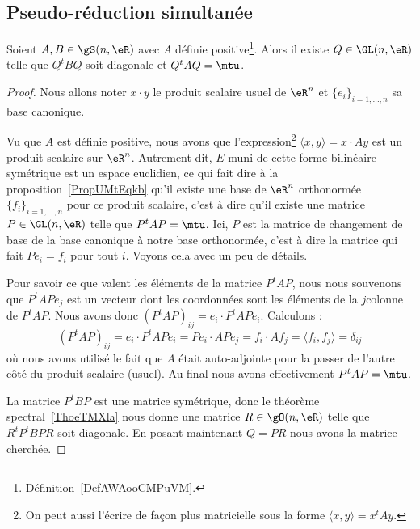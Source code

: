 \subsection{Pseudo-réduction simultanée}

\begin{corollary}  \label{CorNHKnLVA}
    Soient \( A,B\in \gS(n,\eR)\) avec \( A\) définie positive\footnote{Définition~\ref{DefAWAooCMPuVM}.}. Alors il existe \( Q\in \GL(n,\eR)\) telle que \( Q^tBQ\) soit diagonale et \( Q^tAQ=\mtu\).
\end{corollary}

\begin{proof}
    Nous allons noter \( x\cdot y\) le produit scalaire usuel de \( \eR^n\) et \( \{ e_i \}_{i=1,\ldots, n}\) sa base canonique.

    Vu que \( A\) est définie positive, nous avons que l'expression\footnote{On peut aussi l'écrire de façon plus matricielle sous la forme \( \langle x, y\rangle =x^tAy\).} \( \langle x, y\rangle =x\cdot Ay\) est un produit scalaire sur \( \eR^n\). Autrement dit, \( E\) muni de cette forme bilinéaire symétrique est un espace euclidien, ce qui fait dire à la proposition~\ref{PropUMtEqkb} qu'il existe une base de \( \eR^n\) orthonormée \( \{ f_i \}_{i=1,\ldots, n}\) pour ce produit scalaire, c'est à dire qu'il existe une matrice \( P\in \GL(n,\eR)\) telle que \( P^tAP=\mtu\). Ici, \( P\) est la matrice de changement de base de la base canonique à notre base orthonormée, c'est à dire la matrice qui fait \( Pe_i=f_i\) pour tout \( i\). Voyons cela avec un peu de détails.

    Pour savoir ce que valent les éléments de la matrice \( P^tAP\), nous nous souvenons que \( P^tAPe_j\) est un vecteur dont les coordonnées sont les éléments de la \( j\)\ieme colonne de \( P^tAP\). Nous avons donc \( (P^tAP)_{ij}=e_i\cdot P^tAPe_i\). Calculons :
    \begin{equation}
            (P^tAP)_{ij}=e_i\cdot P^tAPe_i
            =Pe_i\cdot APe_j
        =f_i\cdot Af_j
        =\langle f_i, f_j\rangle
        =\delta_{ij}
    \end{equation}
    où nous avons utilisé le fait que \( A\) était auto-adjointe pour la passer de l'autre côté du produit scalaire (usuel). Au final nous avons effectivement \( P^tAP=\mtu\).

    La matrice \( P^tBP\) est une matrice symétrique, donc le théorème spectral~\ref{ThoeTMXla} nous donne une matrice \( R\in \gO(n,\eR)\) telle que \( R^tP^tBPR\) soit diagonale. En posant maintenant \( Q=PR\) nous avons la matrice cherchée.
\end{proof}

